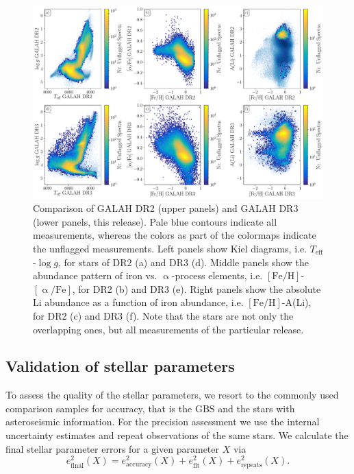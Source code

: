 \documentclass[fleqn,usenatbib,useAMS]{mnras}
\newcommand{\teff}{$T_\mathrm{eff}$\xspace}
\newcommand{\logg}{$\log g$\xspace}
\newcommand{\feh}{$\mathrm{[Fe/H]}$\xspace}
\newcommand{\alphafe}{$\mathrm{[\upalpha/Fe]}$\xspace}
\begin{document}
\begin{figure}
\centering
\includegraphics[width=\textwidth]{figures/galah_dr3_comparison_dr2.pdf}
\caption{Comparison of GALAH DR2 (upper panels) and GALAH DR3 (lower panels, this release). Pale blue contours indicate all measurements, whereas the colors as part of the colormaps indicate the unflagged measurements. Left panels show Kiel diagrams, i.e. \teff-\logg, for stars of DR2 (a) and DR3 (d). Middle panels show the abundance pattern of iron vs. $\upalpha$-process elements, i.e. \feh-\alphafe, for DR2 (b) and DR3 (e). Right panels show the absolute Li abundance as a function of iron abundance, i.e. \feh-A(Li), for DR2 (c) and DR3 (f). Note that the stars are not only the overlapping ones, but all measurements of the particular release.}
\label{fig:galah_dr3_comparison_dr2}
\end{figure}


\subsection{Validation of stellar parameters} \label{sec:validation_sp}

To assess the quality of the stellar parameters, we resort to the commonly used comparison samples for accuracy, that is the GBS and the stars with asteroseismic information. For the precision assessment we use the internal uncertainty estimates and repeat observations of the same stars.  We calculate the final stellar parameter errors for a given parameter $X$ via 
\begin{equation}
e_\text{final}^2 (X) = e_\text{accuracy}^2(X) + e_\text{fit}^2(X) + e_\text{repeats}^2(X). \label{eq:final_error}
\end{equation}
\end{document}
